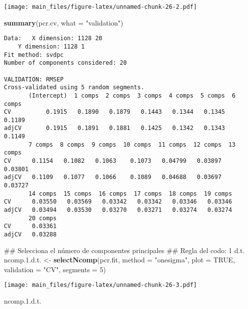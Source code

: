 \documentclass[]{article}
\newenvironment{Shaded}{\begin{snugshade}}{\end{snugshade}}
\newcommand{\KeywordTok}[1]{\textcolor[rgb]{0.13,0.29,0.53}{\textbf{#1}}}
\newcommand{\DataTypeTok}[1]{\textcolor[rgb]{0.13,0.29,0.53}{#1}}
\newcommand{\DecValTok}[1]{\textcolor[rgb]{0.00,0.00,0.81}{#1}}
\newcommand{\FloatTok}[1]{\textcolor[rgb]{0.00,0.00,0.81}{#1}}
\newcommand{\StringTok}[1]{\textcolor[rgb]{0.31,0.60,0.02}{#1}}
\newcommand{\OtherTok}[1]{\textcolor[rgb]{0.56,0.35,0.01}{#1}}
\newcommand{\NormalTok}[1]{#1}
\begin{document}
\texttt{[image: main\_files/figure-latex/unnamed-chunk-26-2.pdf]}

\begin{Shaded}
\begin{Highlighting}[]
\KeywordTok{summary}\NormalTok{(pcr.cv, }\DataTypeTok{what =} \StringTok{"validation"}\NormalTok{)}
\end{Highlighting}
\end{Shaded}

\begin{verbatim}
Data:   X dimension: 1128 20 
    Y dimension: 1128 1
Fit method: svdpc
Number of components considered: 20

VALIDATION: RMSEP
Cross-validated using 5 random segments.
       (Intercept)  1 comps  2 comps  3 comps  4 comps  5 comps  6 comps
CV          0.1915   0.1890   0.1879   0.1443   0.1344   0.1345   0.1189
adjCV       0.1915   0.1891   0.1881   0.1425   0.1342   0.1343   0.1149
       7 comps  8 comps  9 comps  10 comps  11 comps  12 comps  13 comps
CV      0.1154   0.1082   0.1063    0.1073   0.04799   0.03897   0.03801
adjCV   0.1109   0.1077   0.1066    0.1089   0.04688   0.03697   0.03727
       14 comps  15 comps  16 comps  17 comps  18 comps  19 comps
CV      0.03550   0.03569   0.03342   0.03342   0.03346   0.03346
adjCV   0.03494   0.03530   0.03270   0.03271   0.03274   0.03274
       20 comps
CV      0.03361
adjCV   0.03288
\end{verbatim}

\begin{Shaded}
\begin{Highlighting}[]
\NormalTok{## Selecciona el número de componentes principales}
\NormalTok{## Regla del codo: 1 d.t.}
\NormalTok{ncomp.}\FloatTok{1.}\NormalTok{d.t. <-}\StringTok{ }\KeywordTok{selectNcomp}\NormalTok{(pcr.fit, }\DataTypeTok{method =} \StringTok{"onesigma"}\NormalTok{, }\DataTypeTok{plot =} \OtherTok{TRUE}\NormalTok{, }\DataTypeTok{validation =} \StringTok{"CV"}\NormalTok{,}
                            \DataTypeTok{segments =} \DecValTok{5}\NormalTok{)}
\end{Highlighting}
\end{Shaded}

\texttt{[image: main\_files/figure-latex/unnamed-chunk-26-3.pdf]}

\begin{Shaded}
\begin{Highlighting}[]
\NormalTok{ncomp.}\FloatTok{1.}\NormalTok{d.t.}
\end{Highlighting}
\end{Shaded}
\end{document}
